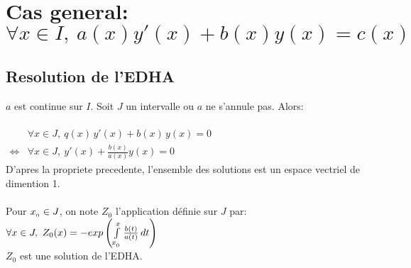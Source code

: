 \documentclass[12pt,twoside,a4paper]{article}
\begin{document}
	\section{Cas general: $\forall x\in I,\ a(x)y'(x)+b(x)y(x)=c(x)$}
		\subsection{Resolution de l'EDHA}
			$a$ est continue sur $I$. Soit $J$ un intervalle ou $a$ ne s'annule pas. Alors:\\\\
			$\begin{aligned}&\forall x \in J,\ q(x)\,y'(x)+b(x)\,y(x)=0\\
				\iff&\forall x \in J,\ y'(x)+\frac{b(x)}{a(x)}y(x)=0\end{aligned}$\\
			D'apres la propriete precedente, l'ensemble des solutions est un espace vectriel de dimention 1.\\
			\\
			Pour $x_{_{0}}\in J$, on note $Z_0$ l'application définie sur $J$ par:\\
			$\forall x\in J,\ Z_0(x)=-exp\left(\int\limits_{x\uu0}^x\frac{b(t)}{a(t)}\,dt\right)$\\
			$Z_0$ est une solution de l'EDHA.
\end{document}
